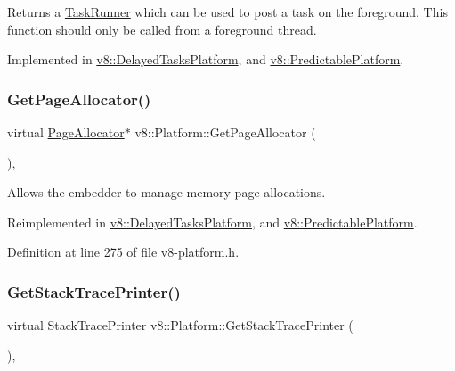 Returns a \mbox{\hyperlink{classv8_1_1TaskRunner}{Task\+Runner}} which can be used to post a task on the foreground. This function should only be called from a foreground thread. 

Implemented in \mbox{\hyperlink{classv8_1_1DelayedTasksPlatform_a822079611fe0e01d3bc5dcf5eaa7f811}{v8\+::\+Delayed\+Tasks\+Platform}}, and \mbox{\hyperlink{classv8_1_1PredictablePlatform_adcf0ce1eba22ca032ed59098e60ce059}{v8\+::\+Predictable\+Platform}}.

\mbox{\label{classv8_1_1Platform_ab7c1886dd8131f7389b805bc98276702}} 
\subsubsection{\texorpdfstring{Get\+Page\+Allocator()}{GetPageAllocator()}}
{\footnotesize\ttfamily virtual \mbox{\hyperlink{classv8_1_1PageAllocator}{Page\+Allocator}}$\ast$ v8\+::\+Platform\+::\+Get\+Page\+Allocator (\begin{DoxyParamCaption}{ }\end{DoxyParamCaption})\hspace{0.3cm}{\ttfamily [inline]}, {\ttfamily [virtual]}}

Allows the embedder to manage memory page allocations. 

Reimplemented in \mbox{\hyperlink{classv8_1_1DelayedTasksPlatform_aa4c38247e7c468f4ad4f449451bb08ae}{v8\+::\+Delayed\+Tasks\+Platform}}, and \mbox{\hyperlink{classv8_1_1PredictablePlatform_ac9e493b7320d723958f47c93dfd1db70}{v8\+::\+Predictable\+Platform}}.



Definition at line 275 of file v8-\/platform.\+h.

\mbox{\label{classv8_1_1Platform_aadb2594e6ff9a6f6a0657412ff5a7206}} 
\subsubsection{\texorpdfstring{Get\+Stack\+Trace\+Printer()}{GetStackTracePrinter()}}
{\footnotesize\ttfamily virtual Stack\+Trace\+Printer v8\+::\+Platform\+::\+Get\+Stack\+Trace\+Printer (\begin{DoxyParamCaption}{ }\end{DoxyParamCaption})\hspace{0.3cm}{\ttfamily [inline]}, {\ttfamily [virtual]}}

